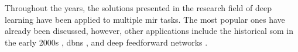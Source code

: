 Throughout the years, the solutions presented in the
research field of deep learning have been applied to
multiple \gls{mir} tasks. The most popular ones have already
been discussed, however, other applications include the
historical \gls{som} in the early 2000s
\parencite{kiernan2000scorebased, harford2003automatic},
\glspl{dbn} \parencite{hamel2010learning,
schmidt2013learning, chacon2014developing,
raczynski2010multiple, battenberg2012analyzing,
herwaarden2014predicting, zhou2015chord}, and deep
feedforward networks \parencite{cherla2014multiple,
liang2015contentaware, dawson2018keyfinding, valk2018deep}.
